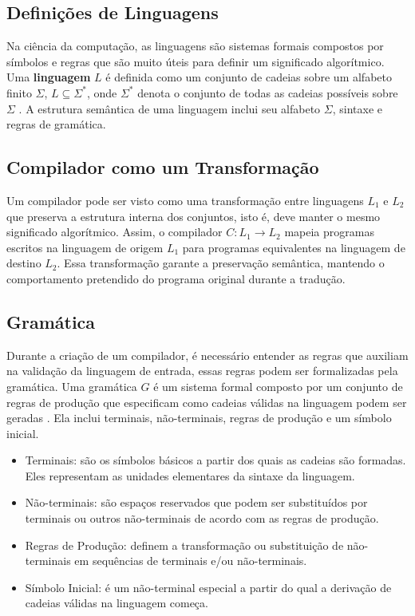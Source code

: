 \documentclass[english, 
               brazil, 
               bsc] %
               {dcomp-abntex2}
\begin{document}
\subsection{Definições de Linguagens} \label{linguagem}


Na ciência da computação, as linguagens são sistemas formais compostos por símbolos e regras que são muito úteis para definir um significado algorítmico. Uma \textbf{linguagem} $L$ é definida como um conjunto de cadeias sobre um alfabeto finito $ \Sigma $, $ L \subseteq \Sigma^* $, onde  $ \Sigma^* $ denota o conjunto de todas as cadeias possíveis sobre $ \Sigma $ \cite{language_theory}. A estrutura semântica de uma linguagem inclui seu alfabeto $ \Sigma $, sintaxe e regras de gramática.


\subsection{Compilador como um Transformação}


Um compilador pode ser visto como uma transformação entre linguagens $ L_1 $ e $ L_2 $ que preserva a estrutura interna dos conjuntos, isto é, deve manter o mesmo significado algorítmico. Assim, o compilador $ C: L_1 \rightarrow L_2 $ mapeia programas escritos na linguagem de origem $ L_1 $ para programas equivalentes na linguagem de destino $ L_2 $. Essa transformação garante a preservação semântica, mantendo o comportamento pretendido do programa original durante a tradução.




\subsection{Gramática} \label{gramatica}


Durante a criação de um compilador, é necessário entender as regras que auxiliam na validação da linguagem de entrada, essas regras podem ser formalizadas pela gramática. Uma gramática $G$ é um sistema formal composto por um conjunto de regras de produção que especificam como cadeias válidas na linguagem podem ser geradas \cite{language_theory}. Ela inclui terminais, não-terminais, regras de produção e um símbolo inicial.


\begin{itemize}
  \item Terminais: são os símbolos básicos a partir dos quais as cadeias são formadas. Eles representam as unidades elementares da sintaxe da linguagem.
  \item Não-terminais: são espaços reservados que podem ser substituídos por terminais ou outros não-terminais de acordo com as regras de produção.


  \item Regras de Produção: definem a transformação ou substituição de não-terminais em sequências de terminais e/ou não-terminais.


  \item Símbolo Inicial: é um não-terminal especial a partir do qual a derivação de cadeias válidas na linguagem começa.
\end{itemize}
\end{document}
